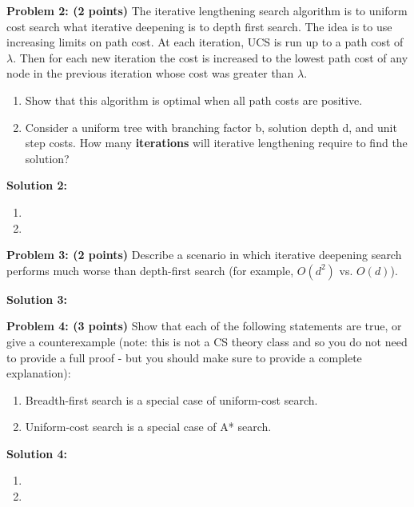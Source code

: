 \documentclass[]{article}
\begin{document}
\clearpage

\textbf{Problem 2: (2 points)}
The iterative lengthening search algorithm is to uniform cost search what iterative deepening is to depth first search. The idea is to use increasing limits on path cost. At each iteration, UCS is run up to a path cost of $\lambda$. Then for each new iteration the cost is increased to the lowest path cost of any node in the previous iteration whose cost was greater than $\lambda$.

\begin{enumerate}[label=(\alph*)]
    \item Show that this algorithm is optimal when all path costs are positive.
    \item Consider a uniform tree with branching factor b, solution depth d, and unit step costs. How many \textbf{iterations} will iterative lengthening require to find the solution?
\end{enumerate}

\bigskip

\textbf{Solution 2:}
\begin{enumerate}[label=(\alph*)]
    \item %
    \item %
\end{enumerate}

\clearpage

\textbf{Problem 3: (2 points)}
Describe a scenario in which iterative deepening search performs much worse than depth-first search (for example, $O(d^2)$ vs. $O(d)$).
\bigskip

\textbf{Solution 3:}

\clearpage

\textbf{Problem 4: (3 points)}
Show that each of the following statements are true, or give a counterexample (note: this is not a CS theory class and so you do not need to provide a full proof - but you should make sure to provide a complete explanation):
\begin{enumerate}[label=(\alph*)]
    \item Breadth-first search is a special case of uniform-cost search.
    \item Uniform-cost search is a special case of A* search.
\end{enumerate}
\bigskip

\textbf{Solution 4:}
\begin{enumerate}[label=(\alph*)]
    \item %
    \item %
\end{enumerate}
\end{document}

